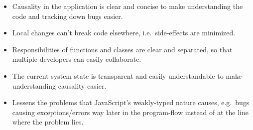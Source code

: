 \begin{itemize}
\item
  Causality in the application is clear and concise to make
  understanding the code and tracking down bugs easier.
\item
  Local changes can't break code elsewhere, i.e.~side-effects are
  minimized.
\item
  Responsibilities of functions and classes are clear and separated, so
  that multiple developers can easily collaborate.
\item
  The current system state is transparent and easily understandable to
  make understanding causality easier.
\item
  Lessens the problems that JavaScript's weakly-typed nature causes,
  e.g.~bugs causing exceptions/errors way later in the program-flow
  instead of at the line where the problem lies.
\end{itemize}

\begin{comment}
in the problem-descripion: list challenges that need to be tackled by web applications:

* seperation of concerns
  * suitability for collaboration
  * reusability of code
* move processing to client / minimal number of requests (justification for js-apps)
* networking
* optimize page load:
  * less http-requests -> bundling
  * smaller size -> minification
  * precompiling templates
* managing dependencies between scripts -> module systems
* simplicity / a low number of concepts / gentle learning curve
* predictability / maintainability


\end{comment}





